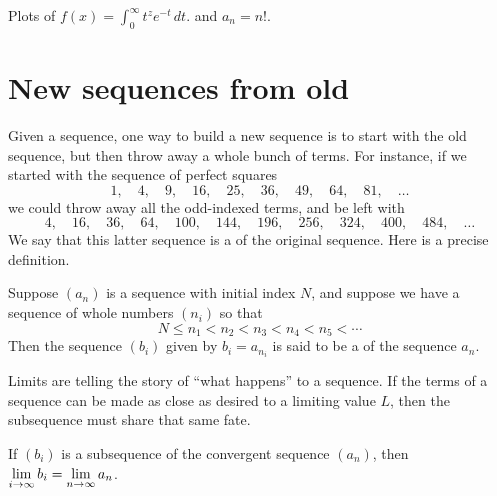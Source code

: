 \begin{marginfigure}[0in]
\caption{Plots of $f(x) = \int_0^\infty t^{z} e^{-t} \, dt.$ and $a_n = n!$.}
\label{fig:gamma-function}
\end{marginfigure}

\section{New sequences from old}
\label{section:new-sequences-from-old}

Given a sequence, one way to build a new sequence is to start with the
old sequence, but then throw away a whole bunch of terms.  For
instance, if we started with the sequence of perfect squares
$$
1,\quad 4,\quad 9,\quad 16,\quad 25,\quad 36,\quad 49,\quad 64,\quad 81,\quad\ldots
$$
we could throw away all the odd-indexed terms, and be left with
$$
4,\quad 16,\quad 36,\quad 64,\quad 100,\quad 144,\quad 196,\quad 256,\quad 324,\quad 400,\quad 484,\quad\ldots
$$
We say that this latter sequence is a
of the original sequence.  Here is a precise definition.

\begin{definition}
  Suppose $(a_n)$ is a sequence with initial index $N$, and suppose we have a sequence of whole numbers $(n_i)$ so that
  $$
  N \leq n_1 < n_2 < n_3 < n_4 < n_5 < \cdots 
  $$
  Then the sequence $(b_i)$ given by $b_i = a_{n_i}$ is said to be a 
  of the sequence $a_n$.
\end{definition}

Limits are telling the story of ``what happens'' to a sequence.  If
the terms of a sequence can be made as close as desired to a limiting
value $L$, then the subsequence must share that same fate.

\begin{theorem}
  \label{theorem:subsequence-same-limit}
  If $(b_i)$ is a subsequence of the convergent sequence $(a_n)$, then
  $\displaystyle\lim_{i \to \infty} b_i = \displaystyle\lim_{n \to \infty} a_n$.
\end{theorem}

